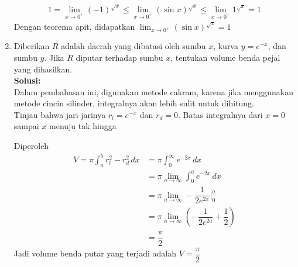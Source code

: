 \documentclass{article}
\begin{document}
\begin{enumerate}
	\begin{align*}
	1=\lim_{x\rightarrow 0^+} (-1)^{\sqrt{x}} \leq \lim_{x\rightarrow 0^+}(\sin x)^{\sqrt{x}} \leq \lim_{x\rightarrow 0^+} 1^{\sqrt{x}} = 1
	\end{align*}
	Dengan teorema apit, didapatkan $\displaystyle \lim_{x\rightarrow 0^+}(\sin x)^{\sqrt{x}}=1$
	\item Diberikan $R$ adalah daerah yang dibatasi oleh sumbu $x$, kurva $y=e^{-x}$, dan sumbu $y$. Jika $R$ diputar terhadap sumbu $x$, tentukan volume benda pejal yang dihasilkan.\\
	\textbf{Solusi:}\\
	Dalam pembahasan ini, digunakan metode cakram, karena jika menggunakan metode cincin silinder, integralnya akan lebih sulit untuk dihitung.\\
	Tinjau bahwa jari-jarinya $r_l=e^{-x}$ dan $r_d=0$. Batas integralnya dari $x=0$ sampai $x$ menuju tak hingga
	\begin{center}
		\end{center}
		Diperoleh 
		\begin{align*}
		V = \pi \int_a^b r_l^2 - r_d^2 \, dx &= \pi \int_0^{\infty} e^{-2x} \, dx\\
		&= \pi \lim_{a\rightarrow \infty} \int_0^a e^{-2x} \, dx\\
		&= \pi \lim_{a\rightarrow \infty} -\dfrac{1}{2e^{2x}} \bigg|^a_0\\
		&= \pi \lim_{a\rightarrow \infty} \left(-\dfrac{1}{2e^{2a}}+\dfrac{1}{2}\right)\\
		&= \dfrac{\pi}{2}
		\end{align*}
		Jadi volume benda putar yang terjadi adalah $V=\dfrac{\pi}{2}$
\end{enumerate}
\newpage
\end{document}
